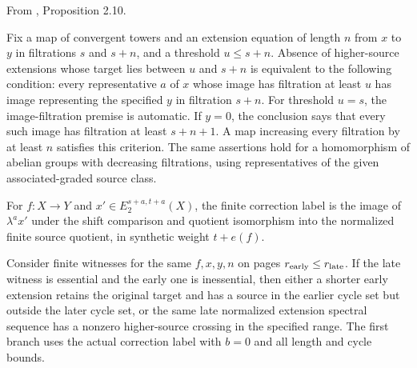 \begin{theorem}
\label{sem:ProofTools:representative-criterion}
From \cite{LWX126}, Proposition 2.10.\par

Fix a map of convergent towers and an extension equation of length $n$ from $x$ to $y$ in filtrations $s$ and $s+n$, and a threshold $u\leq s+n$. Absence of higher-source extensions whose target lies between $u$ and $s+n$ is equivalent to the following condition: every representative $a$ of $x$ whose image has filtration at least $u$ has image representing the specified $y$ in filtration $s+n$. For threshold $u=s$, the image-filtration premise is automatic. If $y=0$, the conclusion says that every such image has filtration at least $s+n+1$. A map increasing every filtration by at least $n$ satisfies this criterion. The same assertions hold for a homomorphism of abelian groups with decreasing filtrations, using representatives of the given associated-graded source class.
\end{theorem}

\begin{definition}
\label{sem:ProofTools:correction-label}
For $f:X\to Y$ and $x'\in E_2^{s+a,t+a}(X)$, the finite correction label is the image of $\lambda^a x'$ under the shift comparison and quotient isomorphism into the normalized finite source quotient, in synthetic weight $t+e(f)$.
\end{definition}

\begin{theorem}
\label{sem:ProofTools:nonliftable-or-crossing}
Consider finite witnesses for the same $f,x,y,n$ on pages $r_{\rm early}\leq r_{\rm late}$. If the late witness is essential and the early one is inessential, then either a shorter early extension retains the original target and has a source in the earlier cycle set but outside the later cycle set, or the same late normalized extension spectral sequence has a nonzero higher-source crossing in the specified range. The first branch uses the actual correction label with $b=0$ and all length and cycle bounds.
\end{theorem}


